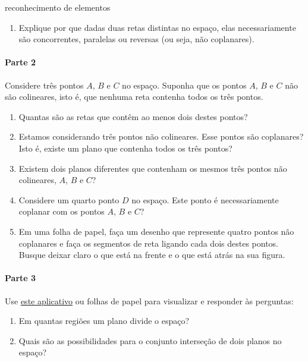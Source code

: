 \begin{task}{reconhecimento de elementos}
\begin{enumerate}
\item {} 
Explique por que dadas duas retas distintas no espaço, elas necessariamente são concorrentes, paralelas ou reversas (ou seja, não coplanares).

\end{enumerate}

\paragraph{Parte 2}

Considere três pontos \(A\), \(B\) e \(C\) no espaço. Suponha que os pontos \(A\), \(B\) e \(C\) não são colineares, isto é, que nenhuma reta contenha todos os três pontos.
\begin{enumerate}
\item {} 
Quantas são as retas que contêm ao menos dois destes pontos?

\item {} 
Estamos considerando três pontos não colineares. Esse pontos são coplanares? Isto é, existe um plano que contenha todos os três pontos?

\item {} 
Existem dois planos diferentes que contenham os mesmos três pontos não colineares, \(A\), \(B\) e \(C\)?

\item {} 
Considere um quarto ponto \(D\) no espaço. Este ponto é necessariamente coplanar com os pontos \(A\), \(B\) e \(C\)?

\item {} 
Em uma folha de papel, faça um desenho que represente quatro pontos não coplanares e faça os segmentos de reta ligando cada dois destes pontos. Busque deixar claro o que está na frente e o que está atrás na sua figura.

\end{enumerate}

\paragraph{Parte 3}

Use \href{https://ggbm.at/ar9et3rv}{este aplicativo} ou folhas de papel para visualizar e responder às perguntas:
\begin{enumerate}
\item {} 
Em quantas regiões um plano divide o espaço?

\item {} 
Quais são as possibilidades para o conjunto interseção de dois planos no espaço?


\end{enumerate}
\end{task}
